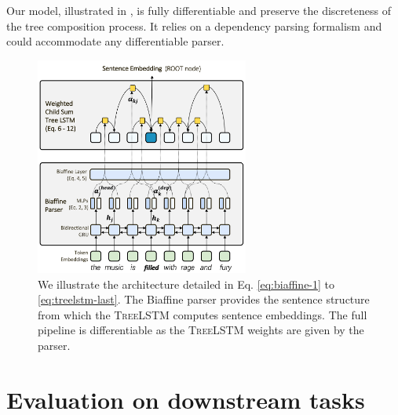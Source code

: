 

Our model, illustrated in , is fully differentiable and preserve the discreteness of the tree composition process. It relies on a dependency parsing formalism and could accommodate any differentiable parser.

\begin{figure}[h!]
	\includegraphics[width=7cm]{images/biaffine-12.png}
	\caption[Biaffine tree lstm]{We illustrate the architecture detailed in Eq. \ref{eq:biaffine-1} to \ref{eq:treelstm-last}. The Biaffine parser provides the sentence structure from which the \textsc{TreeLSTM} computes sentence embeddings. The full pipeline is differentiable as the \textsc{TreeLSTM} weights are given by the parser.}
\end{figure}

\section{Evaluation on downstream tasks}

